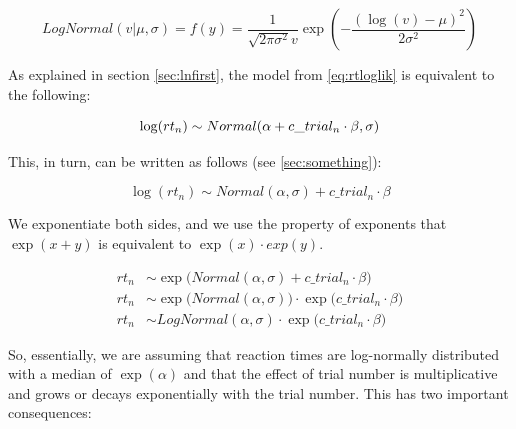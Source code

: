 \documentclass[12pt,]{krantz}
\theoremstyle{definition}
\theoremstyle{definition}
\theoremstyle{definition}
\theoremstyle{remark}
\begin{document}
\begin{equation}
LogNormal(v|\mu,\sigma)=f(y)= \frac{1}{\sqrt{2\pi \sigma^2}v} \exp \left(-\frac{(\log(v)-\mu)^2}{2\sigma^2} \right)
\end{equation}

As explained in section \ref{sec:lnfirst}, the model from \eqref{eq:rtloglik} is equivalent to the following:

\begin{equation}
\log(rt_n) \sim Normal(\alpha + c\_trial_n \cdot \beta,\sigma)\\
\end{equation}

This, in turn, can be written as follows (see \ref{sec:something}):

\begin{equation}
\log(rt_n) \sim Normal(\alpha, \sigma) + c\_trial_n \cdot \beta
\label{eq:rtlogliknoncen}
\end{equation}

We exponentiate both sides, and we use the property of exponents that \(\exp(x+y)\) is equivalent to \(\exp(x) \cdot exp(y)\).

\begin{equation}
\begin{aligned}
rt_n &\sim \exp \big(Normal(\alpha, \sigma)  + c\_trial_n \cdot \beta\big) \\
rt_n &\sim \exp\big(Normal(\alpha, \sigma)\big)   \cdot \exp\big(c\_trial_n \cdot \beta\big) \\
rt_n &\sim LogNormal(\alpha, \sigma)   \cdot \exp\big(c\_trial_n \cdot \beta\big) 
\end{aligned}
\end{equation}

So, essentially, we are assuming that reaction times are log-normally distributed with a median of \(\exp(\alpha)\) and that the effect of trial number is multiplicative and grows or decays exponentially with the trial number. This has two important consequences:
\end{document}
